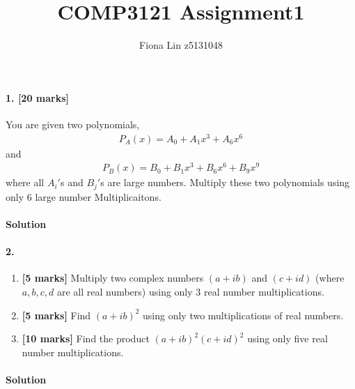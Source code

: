 \documentclass[a4paper]{scrartcl}
\title{COMP3121 Assignment1}
\author{Fiona Lin z5131048}
\begin{document}
\maketitle

\paragraph{1. [20 marks]}
\label{sec:Question 1}
You are given two polynomials,
\begin{align*}
  P_A(x) = A_0 + A_1x^3+A_6x^6
\end{align*}
and
\begin{align*}
  P_B(x) = B_0 + B_1x^3+B_6x^6+B_9x^9
\end{align*}
where all $A_i'$s and $B_j'$s are large numbers. Multiply these two polynomials using only 6 large number Multiplicaitons.
\paragraph{Solution}




\paragraph{2.}
\label{sec:Question 2}
\begin{enumerate}[label=(\alph*)]
  \item {\bfseries[5 marks]} Multiply two complex numbers $(a + ib)$ and $(c + id)$ (where $a, b, c, d$ are all real numbers) using only 3 real number multiplications.
  \item {\bfseries[5 marks]} Find $(a + ib)^2$ using only two multiplications of real numbers.
  \item {\bfseries[10 marks]} Find the product $(a + ib)^2(c + id)^2$ using only five real number multiplications.
\end{enumerate}

\paragraph{Solution}
\end{document}
